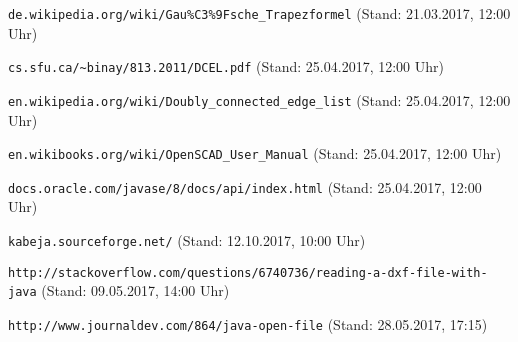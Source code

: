 \begin{thebibliography}{9}
			\verb|de.wikipedia.org/wiki/Gau%C3%9Fsche_Trapezformel| (Stand: 21.03.2017, 12:00 Uhr)
		
		 \verb|cs.sfu.ca/~binay/813.2011/DCEL.pdf| (Stand: 25.04.2017, 12:00 Uhr)

		 \verb|en.wikipedia.org/wiki/Doubly_connected_edge_list| (Stand: 25.04.2017, 12:00 Uhr)
		
		 \verb|en.wikibooks.org/wiki/OpenSCAD_User_Manual| (Stand: 25.04.2017, 12:00 Uhr)
		
		 \verb|docs.oracle.com/javase/8/docs/api/index.html| (Stand: 25.04.2017, 12:00 Uhr)
		
		 \verb|kabeja.sourceforge.net/| (Stand: 12.10.2017, 10:00 Uhr)
		
		 \verb|http://stackoverflow.com/questions/6740736/reading-a-dxf-file-with-java| (Stand: 09.05.2017, 14:00 Uhr)
		
		 \verb|http://www.journaldev.com/864/java-open-file| (Stand: 28.05.2017, 17:15)
	
\end{thebibliography}